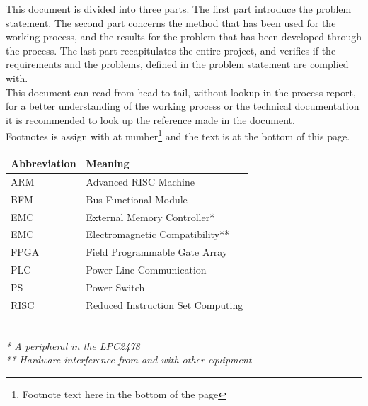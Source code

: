 This document is divided into three parts. The first part introduce the problem statement. The second part concerns the method that has been used for the working process, and the results for the problem that has been developed through the process. The last part recapitulates the entire project, and verifies if the requirements and the problems, defined in the problem statement are complied with.\\
This document can read from head to tail, without lookup in the process report, for a better understanding of the working process or the technical documentation it is recommended to look up the reference made in the document.\\
Footnotes is assign with at number\footnote{Footnote text here in the bottom of the page} and the text is at the bottom of this page.
\begin{table}[H]
    \begin{tabular}{|l|l|}
        \hline
        \textbf{Abbreviation} & \textbf{Meaning} \\ \hline
        ARM		& Advanced RISC Machine \\ \hline
        BFM		& Bus Functional Module \\ \hline
        EMC		& External Memory Controller* \\ \hline
        EMC		& Electromagnetic Compatibility** \\ \hline
        FPGA	& Field Programmable Gate Array \\ \hline
        PLC		& Power Line Communication \\ \hline
        PS		& Power Switch \\ \hline
        RISC	& Reduced Instruction Set Computing \\
        \hline
    \end{tabular}\\
\textit{* A peripheral in the LPC2478}\\
\textit{** Hardware interference from and with other equipment}\\
\end{table}

